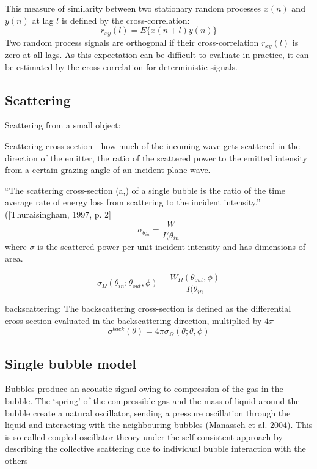 \documentclass[11pt]{article}
\begin{document}
This measure of similarity between two stationary random processes $x(n)$ and $y(n)$ at lag $l$ is defined by the cross-correlation:
\[r_{xy}(l) = E\{x(n + l)y(n)\} \]
Two random process signals are orthogonal if their cross-correlation $r_{xy}(l)$ is zero at all lags.
As this expectation can be difficult to evaluate in practice, it can be estimated by the cross-correlation for deterministic signals.

\subsection{Scattering}

	Scattering from a small object: 
	
	Scattering cross-section -  how much of the incoming wave gets scattered in the direction of the emitter, the ratio of the scattered power to the emitted intensity from a certain grazing angle of an incident plane wave.

 “The scattering cross-section (a,) of a single bubble is the ratio of the time average rate of energy loss from scattering to the incident intensity.” ([Thuraisingham, 1997, p. 2]\cite{thuraisingham_new_1997}
	\[ \sigma_{\theta_{in}} = \frac{W}{I(\theta_{in}}\] where $\sigma$ is the scattered power per unit incident intensity and has dimensions of area.
	
	\[ \sigma_{\Omega}(\theta_{in}; \theta_{out}, \phi ) = \frac{W_{\Omega}(\theta_{out}, \phi )}{I(\theta_{in}}\]  
	


	backscattering: The backscattering cross-section is defined as the differential cross-section evaluated in the backscattering direction, multiplied by $4\pi$
\begin{equation}\label{eq:backscattering}
\sigma^{back}(\theta) =4\pi \sigma_{\Omega}(\theta; \theta, \phi ) 
\end{equation}
	
	

\subsection{Single bubble model}

	Bubbles produce an acoustic signal owing to compression of the gas in the bubble. The ‘spring’ of the compressible gas and the mass of liquid around the bubble create a natural oscillator, sending a pressure oscillation through the liquid and interacting with the neighbouring bubbles (Manasseh et al. 2004)\cite{manasseh_anisotropy_2004}. This is so called coupled-oscillator theory under the self-consistent approach by describing the collective scattering due to individual bubble interaction with the others
\end{document}
